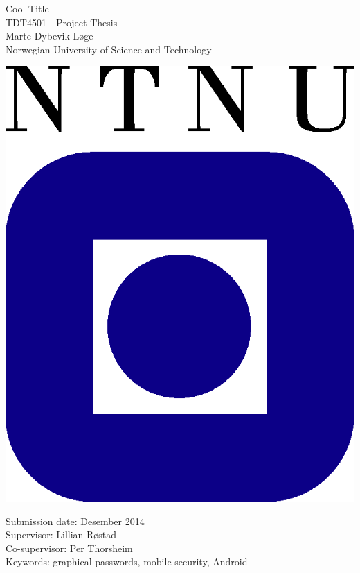 \begin{titlepage}
\begin{center}

	{\Huge Cool Title} \\[0.4cm]


	{\Large TDT4501 - Project Thesis} \\[2.0cm]
	{\Large Marte Dybevik Løge} \\ [0.5cm]
	{\Large Norwegian University of Science and Technology}\\

	\vspace{3.0cm}

			\includegraphics{pics/ntnu-logo2.png}

	\vspace{3.0cm}

	{\Large Submission date: Desember 2014} \\[0.2cm]
	{\Large Supervisor: Lillian Røstad} \\ [0.2cm]
	{\Large Co-supervisor: Per Thorsheim} \\ [0.2cm]
	{\Large Keywords: graphical passwords, mobile security, Android}


\end{center}
\end{titlepage}